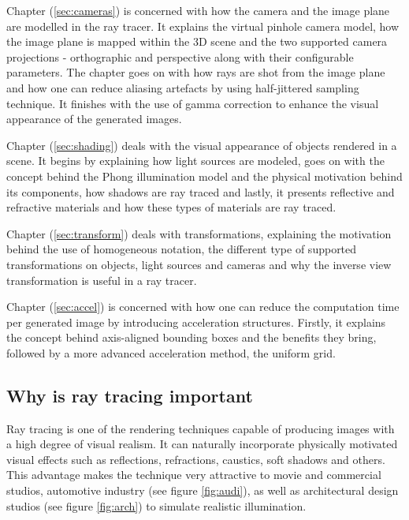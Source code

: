 \documentclass{article}
\begin{document}
\vspace*{\baselineskip}

Chapter (\ref{sec:cameras}) is concerned with how the camera and the image plane are modelled in the ray tracer. It explains the virtual pinhole camera model, how the image plane is mapped within the 3D scene and the two supported camera projections - orthographic and perspective along with their configurable parameters. The chapter goes on with how rays are shot from the image plane and how one can reduce aliasing artefacts by using half-jittered sampling technique. It finishes with the use of gamma correction to enhance the visual appearance of the generated images. 

\vspace*{\baselineskip}

Chapter (\ref{sec:shading}) deals with the visual appearance of objects rendered in a scene. It begins by explaining how light sources are modeled, goes on with the concept behind the Phong illumination model and the physical motivation behind its components, how shadows are ray traced and lastly, it presents reflective and refractive materials and how these types of materials are ray traced.

\vspace*{\baselineskip}

Chapter (\ref{sec:transform}) deals with transformations, explaining the motivation behind the use of homogeneous notation, the different type of supported transformations on objects, light sources and cameras and why the inverse view transformation is useful in a ray tracer.

\vspace*{\baselineskip}

Chapter (\ref{sec:accel}) is concerned with how one can reduce the computation time per generated image by introducing acceleration structures. Firstly, it explains the concept behind axis-aligned bounding boxes and the benefits they bring, followed by a more advanced acceleration method, the uniform grid.

\subsection{Why is ray tracing important}
Ray tracing is one of the rendering techniques capable of producing images with a high degree of visual realism. It can naturally incorporate physically motivated visual effects such as reflections, refractions, caustics, soft shadows and others. This advantage makes the technique very attractive to movie and commercial studios, automotive industry (see figure \ref{fig:audi}), as well as architectural design studios (see figure \ref{fig:arch}) to simulate realistic illumination.  
\end{document}
